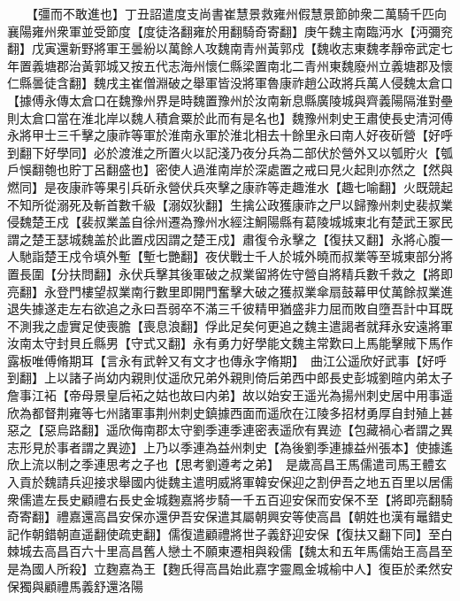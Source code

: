 　　【彊而不敢進也】丁丑詔遣度支尚書崔慧景救雍州假慧景節帥衆二萬騎千匹向襄陽雍州衆軍並受節度【度徒洛翻雍於用翻騎奇寄翻】庚午魏主南臨沔水【沔彌兖翻】戊寅還新野將軍王曇紛以萬餘人攻魏南青州黃郭戍【魏收志東魏孝靜帝武定七年置義塘郡治黃郭城又按五代志海州懷仁縣梁置南北二青州東魏廢州立義塘郡及懷仁縣曇徒含翻】魏戌主崔僧淵破之舉軍皆没將軍魯康祚趙公政將兵萬人侵魏太倉口【據傅永傳太倉口在魏豫州界是時魏置豫州於汝南新息縣廣陵城與齊義陽隔淮對壘則太倉口當在淮北岸以魏人積倉粟於此而有是名也】魏豫州刺史王肅使長史清河傅永將甲士三千擊之康祚等軍於淮南永軍於淮北相去十餘里永曰南人好夜斫營【好呼到翻下好學同】必於渡淮之所置火以記淺乃夜分兵為二部伏於營外又以瓠貯火【瓠戶悞翻匏也貯丁呂翻盛也】密使人過淮南岸於深處置之戒曰見火起則亦然之【然與燃同】是夜康祚等果引兵斫永營伏兵夾擊之康祚等走趣淮水【趣七喻翻】火既競起不知所從溺死及斬首數千級【溺奴狄翻】生擒公政獲康祚之尸以歸豫州刺史裴叔業侵魏楚王戍【裴叔業盖自徐州遷為豫州水經注鮦陽縣有葛陵城城東北有楚武王冢民謂之楚王瑟城魏盖於此置戍因謂之楚王戍】肅復令永擊之【復扶又翻】永將心腹一人馳詣楚王戍令填外塹【塹七艷翻】夜伏戰士千人於城外曉而叔業等至城東部分將置長圍【分扶問翻】永伏兵擊其後軍破之叔業留將佐守營自將精兵數千救之【將即亮翻】永登門樓望叔業南行數里即開門奮擊大破之獲叔業傘扇鼓幕甲仗萬餘叔業進退失據遂走左右欲追之永曰吾弱卒不滿三千彼精甲猶盛非力屈而敗自墮吾計中耳既不測我之虚實足使喪膽【喪息浪翻】俘此足矣何更追之魏主遣謁者就拜永安遠將軍汝南太守封貝丘縣男【守式又翻】永有勇力好學能文魏主常歎曰上馬能擊賊下馬作露板唯傅脩期耳【言永有武幹又有文才也傳永字脩期】　曲江公遥欣好武事【好呼到翻】上以諸子尚幼内親則仗遥欣兄弟外親則倚后弟西中郎長史彭城劉暄内弟太子詹事江袥【帝母景皇后袥之姑也故曰内弟】故以始安王遥光為揚州刺史居中用事遥欣為都督荆雍等七州諸軍事荆州刺史鎮據西面而遥欣在江陵多招材勇厚自封殖上甚惡之【惡烏路翻】遥欣侮南郡太守劉季連季連密表遥欣有異迹【包藏禍心者謂之異志形見於事者謂之異迹】上乃以季連為益州刺史【為後劉季連據益州張本】使據遙欣上流以制之季連思考之子也【思考劉遵考之弟】　是歲高昌王馬儒遣司馬王體玄入貢於魏請兵迎接求舉國内徙魏主遣明威將軍韓安保迎之割伊吾之地五百里以居儒衆儒遣左長史顧禮右長史金城麴嘉將步騎一千五百迎安保而安保不至【將即亮翻騎奇寄翻】禮嘉還高昌安保亦還伊吾安保遣其屬朝興安等使高昌【朝姓也漢有鼂錯史記作朝錯朝直遥翻使疏吏翻】儒復遣顧禮將世子義舒迎安保【復扶又翻下同】至白棘城去高昌百六十里高昌舊人戀土不願東遷相與殺儒【魏太和五年馬儒始王高昌至是為國人所殺】立麴嘉為王【麴氏得高昌始此嘉字靈鳳金城榆中人】復臣於柔然安保獨與顧禮馬義舒還洛陽

